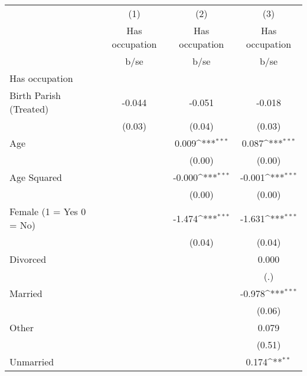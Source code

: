 {
\def\sym#1{\ifmmode^{#1}\else\(^{#1}\)\fi}
\begin{tabular}{l*{3}{c}}
\hline\hline
                    &\multicolumn{1}{c}{(1)}&\multicolumn{1}{c}{(2)}&\multicolumn{1}{c}{(3)}\\
                    &\multicolumn{1}{c}{Has occupation}&\multicolumn{1}{c}{Has occupation}&\multicolumn{1}{c}{Has occupation}\\
                    &        b/se         &        b/se         &        b/se         \\
\hline
Has occupation      &                     &                     &                     \\
Birth Parish (Treated)&      -0.044         &      -0.051         &      -0.018         \\
                    &      (0.03)         &      (0.04)         &      (0.03)         \\
Age                 &                     &       0.009\sym{***}&       0.087\sym{***}\\
                    &                     &      (0.00)         &      (0.00)         \\
Age Squared         &                     &      -0.000\sym{***}&      -0.001\sym{***}\\
                    &                     &      (0.00)         &      (0.00)         \\
Female (1 = Yes 0 = No)&                     &      -1.474\sym{***}&      -1.631\sym{***}\\
                    &                     &      (0.04)         &      (0.04)         \\
Divorced            &                     &                     &       0.000         \\
                    &                     &                     &         (.)         \\
Married             &                     &                     &      -0.978\sym{***}\\
                    &                     &                     &      (0.06)         \\
Other               &                     &                     &       0.079         \\
                    &                     &                     &      (0.51)         \\
Unmarried           &                     &                     &       0.174\sym{**} \\

\end{tabular}}
